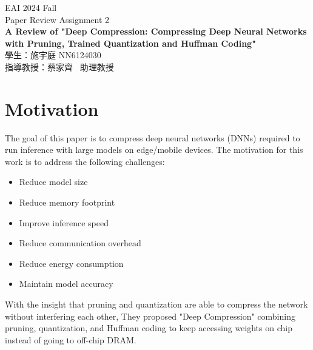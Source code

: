 \documentclass[12pt]{article}
\begin{document}


\begin{titlepage}
\begin{center}

\vspace*{1cm}
\large EAI 2024 Fall \\
\Large Paper Review Assignment 2 \\

\vspace{2cm}
\LARGE \textbf{A Review of "Deep Compression: Compressing Deep Neural Networks with Pruning, Trained Quantization and Huffman Coding"} \\

\vfill
\normalsize
學生：施宇庭 NN6124030 \\ [0.2cm]
指導教授：蔡家齊 \ 助理教授 \\ [0.2cm]

\end{center}
\end{titlepage}



\section{Motivation}

The goal of this paper is to compress deep neural networks (DNNs) required to run inference with large models on edge/mobile devices. The motivation for this work is to address the following challenges:

\begin{itemize}
    \item Reduce model size
    \item Reduce memory footprint
    \item Improve inference speed
    \item Reduce communication overhead
    \item Reduce energy consumption
    \item Maintain model accuracy
\end{itemize}

With the insight that pruning and quantization are able to compress the network without interfering each other, They proposed "Deep Compression" combining pruning, quantization, and Huffman coding to keep accessing weights on chip instead of going to off-chip DRAM.
\end{document}
